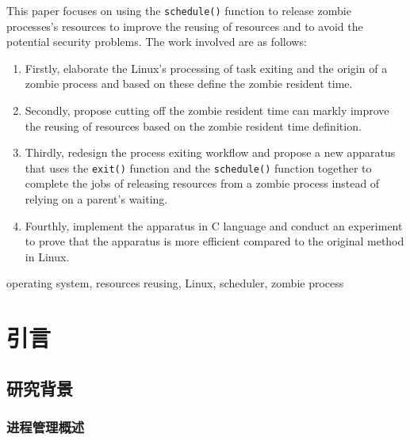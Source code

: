 \documentclass{swfuthesism}
\begin{document}
\begin{eabstract}
  This paper focuses on using the \texttt{schedule()} function to release zombie
  processes's resources to improve the reusing of resources and to avoid the potential
  security problems. The work involved are as follows:
  \begin{enumerate}
  \item Firstly, elaborate the Linux's processing of task exiting and the origin of a
    zombie process and based on these define the zombie resident time.
  \item Secondly, propose cutting off the zombie resident time can markly improve the
    reusing of resources based on the zombie resident time definition.
  \item Thirdly, redesign the process exiting workflow and propose a new apparatus that uses
    the \texttt{exit()} function and the \texttt{schedule()} function together to complete
    the jobs of releasing resources from a zombie process instead of relying on a parent's
    waiting.
  \item Fourthly, implement the apparatus in C language and conduct an experiment to prove
    that the apparatus is more efficient compared to the original method in Linux.
  \end{enumerate}
\end{eabstract}

\begin{ekeyword}
  operating system, resources reusing, Linux, scheduler, zombie process
\end{ekeyword}

\frontmatter          
\tableofcontents     %
\cleardoublepage %

\mainmatter{}

\chapter{引言}

\section{研究背景}

\subsection{进程管理概述}
\label{sec:proc}
\end{document}
